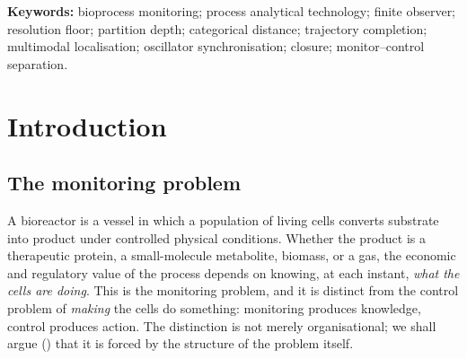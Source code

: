\documentclass[11pt,twocolumn,a4paper]{article}
\theoremstyle{thmstyle}
\theoremstyle{definition}
\theoremstyle{remark}
\begin{document}
\begin{abstract}
coordinates at zero communication overhead, and its loss of coherence is
itself a first-class fault signal. We give an explicit, honest stopping
rule---\emph{closure}---that is strictly stronger than crossing a
confidence threshold and that terminates every monitoring query either in
a single reported state or in an explicit declaration that the evidence
is contested. We establish, as a structural result, that process
monitoring and process control must be kept as separate frameworks: a
system that acts on its own observations cannot serve as an unbiased
observer of the process it acts on, and the monitoring floor forbids the
point-precision that a fused controller would presume. The framework's
worst-case output is therefore never a wrong action but detailed,
uncertainty-bounded information about the process. We specify the complete
monitoring pipeline as an algorithm, state its complexity and correctness
guarantees, and describe how each abstract quantity maps to a physical
bioreactor observable. Every result is proved from the stated premises and
additionally verified on explicitly constructed instances, where a suite of
seven experiments comprising thirty-four checks finds every measured
quantity in agreement with the predicted bound; the paper is self-contained.
\end{abstract}

\noindent\textbf{Keywords:} bioprocess monitoring; process analytical
technology; finite observer; resolution floor; partition depth;
categorical distance; trajectory completion; multimodal localisation;
oscillator synchronisation; closure; monitor--control separation.

\tableofcontents

\section{Introduction}
\label{sec:intro}

\subsection{The monitoring problem}

A bioreactor is a vessel in which a population of living cells converts
substrate into product under controlled physical conditions. Whether the
product is a therapeutic protein, a small-molecule metabolite, biomass, or
a gas, the economic and regulatory value of the process depends on knowing,
at each instant, \emph{what the cells are doing}. This is the monitoring
problem, and it is distinct from the control problem of \emph{making} the
cells do something: monitoring produces knowledge, control produces action.
The distinction is not merely organisational; we shall argue
() that it is forced by the structure of the problem
itself.
\end{document}

